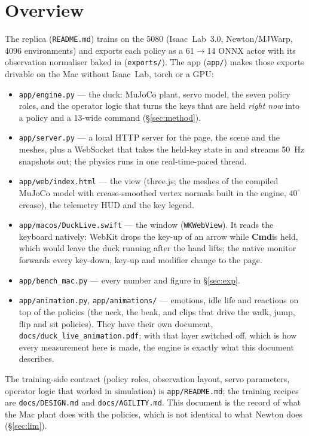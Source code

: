 \documentclass[11pt]{article}
\newcommand{\code}[1]{\texttt{\small #1}}
\newcommand{\cmdkey}{\textsf{\textbf{Cmd}}}      %
\begin{document}
\section{Overview}
The replica (\code{README.md}) trains on the 5080 (Isaac~Lab~3.0, Newton/MJWarp, 4096 environments) and exports
each policy as a 61$\to$14 ONNX actor with its observation normaliser baked in (\code{exports/}). The app
(\code{app/}) makes those exports drivable on the Mac without Isaac~Lab, torch or a GPU:
\begin{itemize}[nosep]
\item \code{app/engine.py} --- the duck: MuJoCo plant, servo model, the seven policy roles, and the operator logic
  that turns the keys that are held \emph{right now} into a policy and a 13-wide command (\S\ref{sec:method}).
\item \code{app/server.py} --- a local HTTP server for the page, the scene and the meshes, plus a WebSocket that
  takes the held-key state in and streams 50~Hz snapshots out; the physics runs in one real-time-paced thread.
\item \code{app/web/index.html} --- the view (three.js; the meshes of the compiled MuJoCo model with
  crease-smoothed vertex normals built in the engine, $40^\circ$ crease), the telemetry HUD and the key legend.
\item \code{app/macos/DuckLive.swift} --- the window (\code{WKWebView}). It reads the keyboard natively: WebKit
  drops the key-up of an arrow while \cmdkey is held, which would leave the duck running after the hand
  lifts; the native monitor forwards every key-down, key-up and modifier change to the page.
\item \code{app/bench\_mac.py} --- every number and figure in \S\ref{sec:exp}.
\item \code{app/animation.py}, \code{app/animations/} --- emotions, idle life and reactions on top of the policies
  (the neck, the beak, and clips that drive the walk, jump, flip and sit policies). They have their own document,
  \code{docs/duck\_live\_animation.pdf}; with that layer switched off, which is how every measurement here is made,
  the engine is exactly what this document describes.
\end{itemize}
The training-side contract (policy roles, observation layout, servo parameters, operator logic that worked in
simulation) is \code{app/README.md}; the training recipes are \code{docs/DESIGN.md} and \code{docs/AGILITY.md}. This
document is the record of what the Mac plant does with the policies, which is not identical to what Newton does
(\S\ref{sec:lim}).
\end{document}
